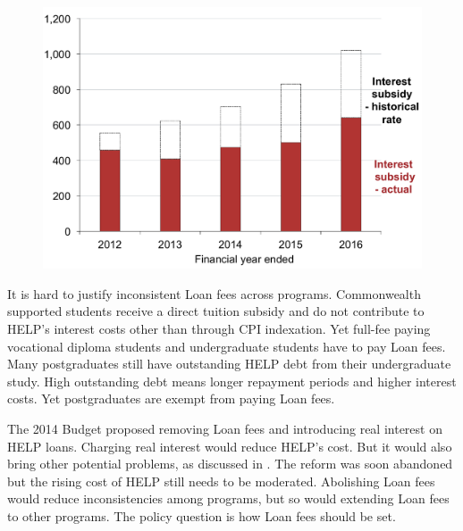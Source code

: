 \documentclass[embargoed]{grattan}
\begin{document}
\begin{figure}
\begin{minipage}[t][\textheight]{\columnwidth}
\includegraphics[page=19]{atlas/Chartpack.pdf}

\end{minipage}
\end{figure}

It is hard to justify inconsistent \gls{Loan fees} across programs.
\gls{Commonwealth supported} students receive a direct tuition subsidy and do not contribute to \gls{HELP}'s interest costs other than through \gls{CPI} indexation.
Yet full-fee paying vocational diploma students and undergraduate students have to pay \gls{Loan fees}.
Many postgraduates still have outstanding \gls{HELP} debt from their undergraduate study.
High outstanding debt means longer repayment periods and higher interest costs.
Yet postgraduates are exempt from paying \gls{Loan fees}.

The 2014 Budget proposed removing \gls{Loan fees} and introducing real interest on \gls{HELP} loans.
Charging real interest would reduce \gls{HELP}'s cost.
But it would also bring other potential problems, as discussed in .
The reform was soon abandoned but the rising cost of \gls{HELP} still needs to be moderated.
Abolishing \gls{Loan fees} would reduce inconsistencies among programs, but so would extending \gls{Loan fees} to other programs.
The policy question is how \gls{Loan fees} should be set.
\end{document}
